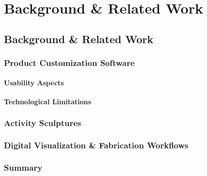 \chapter{Background \& Related Work}
\label{ch:related}
\section{Background \& Related Work}

\subsection{Product Customization Software}
\subsubsection{Usability Aspects}
\subsubsection{Technological Limitations}
\subsection{Activity Sculptures}
\subsection{Digital Visualization \& Fabrication Workflows}
\subsection{Summary}
